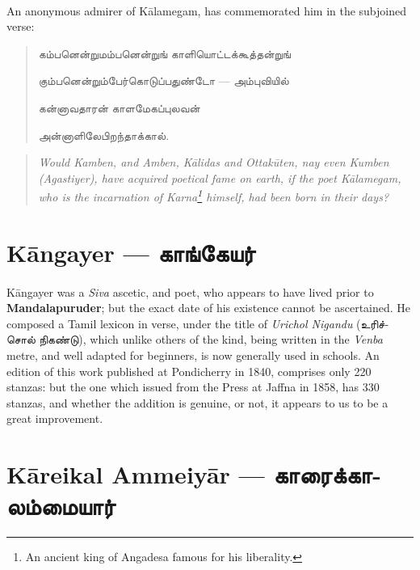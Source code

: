 \documentclass{article}
\newcommand{\TamilText}[1]{\texttamil{#1}}
\newcommand{\TamilBold}[1]{\texttamil{\textbf{#1}}}
\newcommand{\tam}[1]{\TamilText{#1}}
\newcommand{\tambold}[1]{\TamilBold{#1}}
\begin{document}
\paragraph{}
An anonymous admirer of K\={a}lamegam, has commemorated him in the subjoined verse:
\begin{quotation}\small
\tam{கம்பனென்றுமம்பனென்றுங்‌ காளியொட்டக்கூத்தன்றுங்‌}

\tam{கும்பனென்றும்பேர்கொடுப்பதுண்டோ} --- \tam{அம்புவியில்‌}

\tam{கன்னாவதாரன்‌ காளமேகப்புலவன்‌}

\tam{அன்னாளிலேபிறந்தாக்கால்‌}.
\end{quotation}
\begin{quotation}\small
\emph{Would Kamben, and Amben, K\={a}lidas and Ottak\={u}ten, nay even Kumben (Agastiyer), have acquired poetical fame on earth, if the poet K\={a}lamegam, who is the incarnation of Karna\footnote{An ancient king of Angadesa famous for his liberality.} himself, had been born in their days?}
\end{quotation}

\section{K\={a}ngayer --- \tambold{காங்கேயர்}}
\paragraph{}
K\={a}ngayer was a \emph{Siva} ascetic, and poet, who appears to have lived prior to \textbf{Mandalapuruder}; but the exact date of his existence cannot be ascertained. He composed a Tamil lexicon in verse, under the title of \emph{Urichol Nigandu} (\tam{உரிச்சொல் நிகண்டு}), which unlike others of the kind, being written in the \emph{Venba} metre, and well adapted for beginners, is now generally used in schools. An edition of this work published at Pondicherry in 1840, comprises only 220 stanzas: but the one which issued from the Press at Jaffna in 1858, has 330 stanzas, and whether the addition is genuine, or not, it appears to us to be a great improvement.

\section{K\={a}reikal Ammeiy\={a}r --- \tambold{காரைக்காலம்மையார்}}
\end{document}
